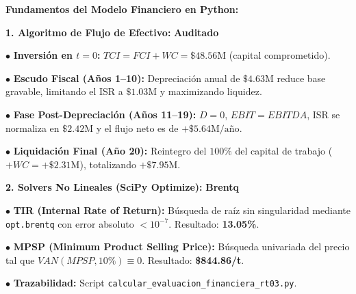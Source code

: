 \documentclass[10pt,landscape]{article}
\newcommand{\badgegreen}[1]{\colorbox{badgegreen}{\textbf{\color{emeraldgreen}\fontsize{6.8pt}{8pt}\selectfont #1}}}
\begin{document}
\begin{minipage}[t]{0.45\textwidth}
  \begin{tcolorbox}[colback=white,colframe=navyblue!70,arc=1.5mm,boxrule=0.7pt,top=2pt,bottom=2pt,left=3pt,right=3pt,height=4.85cm]
    {\fontsize{6.5pt}{7.5pt}\selectfont \textbf{\color{navyblue}Fundamentos del Modelo Financiero en Python:}}\par
    \vspace{1.5pt}
    
    \begin{tcolorbox}[colback=softblue,colframe=navyblue!40,arc=1.0mm,boxrule=0.5pt,top=1.2pt,bottom=1.2pt,left=2.5pt,right=2.5pt]
      {\fontsize{5.2pt}{6.2pt}\selectfont \textbf{\color{navyblue}1. Algoritmo de Flujo de Efectivo:} \hfill \badgegreen{Auditado}}\par
      {\fontsize{4.6pt}{5.5pt}\selectfont
        $\bullet$ \textbf{Inversión en $t=0$:} $TCI = FCI + WC = \$48.56\text{M}$ (capital comprometido).\par
        $\bullet$ \textbf{Escudo Fiscal (Años 1--10):} Depreciación anual de $\$4.63\text{M}$ reduce base gravable, limitando el ISR a $\$1.03\text{M}$ y maximizando liquidez.\par
        $\bullet$ \textbf{Fase Post-Depreciación (Años 11--19):} $D = 0$, $EBIT = EBITDA$, ISR se normaliza en $\$2.42\text{M}$ y el flujo neto es de $+\$5.64\text{M/año}$.\par
        $\bullet$ \textbf{Liquidación Final (Año 20):} Reintegro del $100\%$ del capital de trabajo ($+WC = +\$2.31\text{M}$), totalizando $+\$7.95\text{M}$.
      }
    \end{tcolorbox}
    \vspace{1.0pt}
    \begin{tcolorbox}[colback=softblue,colframe=navyblue!40,arc=1.0mm,boxrule=0.5pt,top=1.2pt,bottom=1.2pt,left=2.5pt,right=2.5pt]
      {\fontsize{5.2pt}{6.2pt}\selectfont \textbf{\color{navyblue}2. Solvers No Lineales (SciPy Optimize):} \hfill \badgegreen{Brentq}}\par
      {\fontsize{4.6pt}{5.5pt}\selectfont
        $\bullet$ \textbf{TIR (Internal Rate of Return):} Búsqueda de raíz sin singularidad mediante \texttt{opt.brentq} con error absoluto $< 10^{-7}$. Resultado: \textbf{13.05\%}.\par
        $\bullet$ \textbf{MPSP (Minimum Product Selling Price):} Búsqueda univariada del precio tal que $VAN(MPSP, 10\%) \equiv 0$. Resultado: \textbf{\$844.86/t}.\par
        $\bullet$ \textbf{Trazabilidad:} Script \texttt{calcular\_evaluacion\_financiera\_rt03.py}.
      }
    \end{tcolorbox}
  \end{tcolorbox}
\end{minipage}
\end{document}
